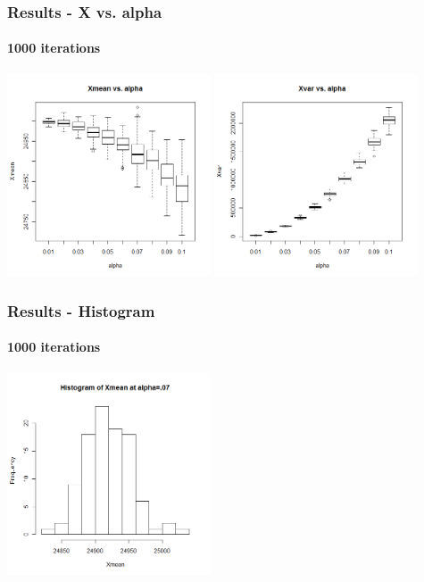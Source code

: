 \begin{frame}
    \frametitle{Results - X vs. alpha }
	\framesubtitle{1000 iterations}
\hspace*{-5mm}
\includegraphics[height=6cm]{boxplot1000_xmean_alpha}
\includegraphics[height=6cm]{boxplot1000_xvar_alpha}
\end{frame}

\begin{frame}
    \frametitle{Results - Histogram}
	\framesubtitle{1000 iterations}
\includegraphics[height=6cm]{hist1000_xmean_alpha07}
\end{frame}





